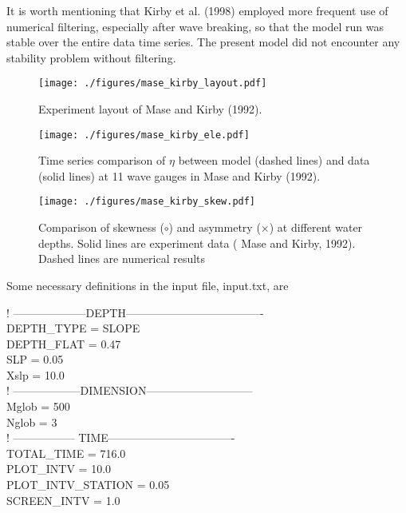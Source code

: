 \documentclass[11pt]{article}
\begin{document}
It is worth mentioning that  Kirby et al. (1998) employed more frequent use of numerical filtering, especially after wave breaking, so that the model run was stable over the entire data time series.  The present model did not encounter any stability problem without filtering. 

\begin{figure}[htbp]
\centering
\texttt{[image: ./figures/mase\_kirby\_layout.pdf]}
\caption{Experiment layout of Mase and Kirby (1992).}
\label{fig5}
\end{figure}

\begin{figure}[htbp]
\centering
\texttt{[image: ./figures/mase\_kirby\_ele.pdf]}
\caption{Time series comparison of $\eta$ between model (dashed lines) and data (solid lines) at 11 wave gauges in Mase and Kirby (1992).}
\label{fig6}
\end{figure}

\begin{figure}[htbp]
\centering
\texttt{[image: ./figures/mase\_kirby\_skew.pdf]}
\caption{Comparison of skewness ($\circ$) and asymmetry ($\times$) at different water depths. Solid lines are experiment data ( Mase and Kirby, 1992). Dashed lines are numerical results}
\label{fig7}
\end{figure}

Some necessary definitions  in the input file, input.txt,  are

\vspace{0.5cm}
  ! --------------------DEPTH------------------------------------- \\
DEPTH\_TYPE = SLOPE \\
DEPTH\_FLAT = 0.47\\
SLP = 0.05\\
Xslp = 10.0\\

  ! ------------------DIMENSION-----------------------------\\
Mglob = 500\\
Nglob = 3\\

  ! ----------------- TIME----------------------------------\\
TOTAL\_TIME = 716.0\\
PLOT\_INTV = 10.0\\
PLOT\_INTV\_STATION = 0.05\\
SCREEN\_INTV = 1.0\\
\end{document}
